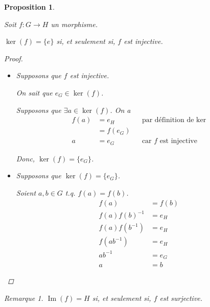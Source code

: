 \documentclass{report}
\newcommand*{\image}{\operatorname{Im}}
\newtheorem*{prop}{Proposition}
\theoremstyle{definition}
\theoremstyle{remark}
\newtheorem*{rema}{Remarque}
\begin{document}
	\begin{prop}~

		Soit $f:G \to H$ un morphisme.

		$\ker(f) = \{e\}$ si, et seulement si, $f$ est injective.
		\begin{proof}~

			\begin{itemize}
				\item[$(\Leftarrow)$] Supposons que $f$ est injective.

				On sait que $e_G \in \ker(f)$.

				Supposons que $\exists a \in \ker(f)$. On a
				\begin{align*}
					f(a)&= e_H&&\text{par d\'efinition de }\ker\\
					&= f(e_G)\\
					a&= e_G&&\text{car $f$ est injective}
				\end{align*}

				Donc, $\ker(f) = \{e_G\}$.
				\item[$(\Rightarrow)$] Supposons que $\ker(f) = \{e_G\}$.

				Soient $a,b \in G$ t.q. $f(a) = f(b)$.
				\begin{align*}
					f(a)&= f(b)\\
					f(a)f(b)^{-1}&= e_H\\
					f(a)f(b^{-1})&= e_H\\
					f(ab^{-1})&= e_H\\
					ab^{-1}&= e_G\\
					a&= b
				\end{align*}
			\end{itemize}
		\end{proof}
		\begin{rema}
			$\image(f)=H$ si, et seulement si, $f$ est surjective.
		\end{rema}
	\end{prop}
\end{document}
